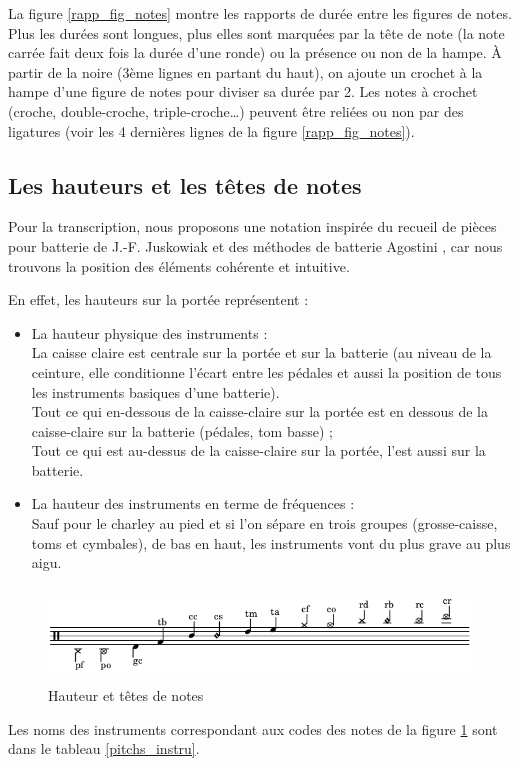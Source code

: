 La figure \ref{rapp_fig_notes} montre les rapports de durée entre les figures de notes. Plus les durées sont longues, plus elles sont marquées par la tête de note (la note carrée fait deux fois la durée d’une ronde) ou la présence ou non de la hampe. À partir de la noire (3ème lignes en partant du haut), on ajoute un crochet à la hampe d’une figure de notes pour diviser sa durée par 2. 
Les notes à crochet (croche, double-croche, triple-croche…) 
peuvent être reliées ou non par des ligatures (voir les 4 dernières lignes de la figure \ref{rapp_fig_notes}).

\subsection*{Les hauteurs et les têtes de notes}
Pour la transcription, nous proposons une notation inspirée du recueil de pièces pour batterie de J.-F. Juskowiak \cite{jusko} et des méthodes de batterie Agostini \cite{ago_meth_3}, car nous trouvons la position des éléments cohérente et intuitive.

En effet, les hauteurs sur la portée représentent :
\begin{itemize}
	\item La hauteur physique des instruments :\\
	La caisse claire est centrale sur la portée et sur la batterie (au niveau de la ceinture, elle conditionne l’écart entre les pédales et aussi la position de tous les instruments basiques d’une batterie).\\
	Tout ce qui en-dessous de la caisse-claire sur la portée est en dessous de la caisse-claire sur la batterie (pédales, tom basse) ;\\
	Tout ce qui est au-dessus de la caisse-claire sur la portée, l’est aussi sur la batterie.\\
	\item La hauteur des instruments en terme de fréquences :\\
	Sauf pour le charley au pied et si l’on sépare en trois groupes (grosse-caisse, toms et cymbales), de bas en haut, les instruments vont du plus grave au plus aigu.
\end{itemize}
\begin{figure}[!h]
	\centering
	\includegraphics[height=25mm, width=130mm]{z_images/3_methodes/0_notation_de_la_batterie/2_hauteurs_et_tete_de_notes.png}
	\caption{Hauteur et têtes de notes}
	\label{Hauteur et têtes de notes}
\end{figure}
Les noms des instruments correspondant aux codes des notes 
de la figure \ref{Hauteur et têtes de notes} sont dans le tableau \ref{pitchs_instru}.

